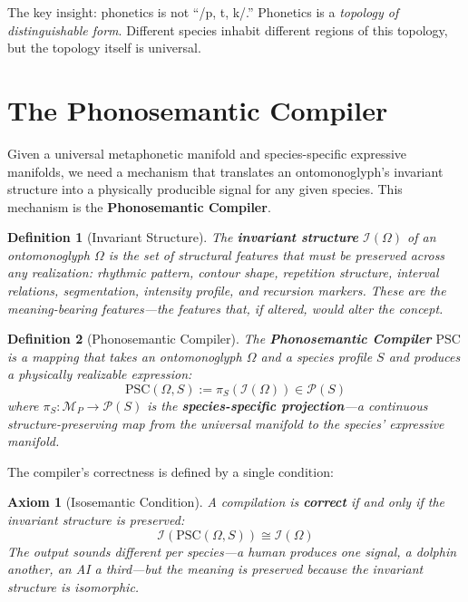 \documentclass[12pt, letterpaper]{book}
\newtheorem{axiom}{Axiom}[chapter]
\newtheorem{definition}{Definition}[chapter]
\begin{document}
The key insight: phonetics is not ``/p, t, k/.'' Phonetics is a \textit{topology of distinguishable form}. Different species inhabit different regions of this topology, but the topology itself is universal.


\section{The Phonosemantic Compiler}

Given a universal metaphonetic manifold and species-specific expressive manifolds, we need a mechanism that translates an ontomonoglyph's invariant structure into a physically producible signal for any given species. This mechanism is the \textbf{Phonosemantic Compiler}.

\begin{definition}[Invariant Structure]\label{def:invariants}
The \textbf{invariant structure} $\mathcal{I}(\Omega)$ of an ontomonoglyph $\Omega$ is the set of structural features that must be preserved across any realization: rhythmic pattern, contour shape, repetition structure, interval relations, segmentation, intensity profile, and recursion markers. These are the meaning-bearing features---the features that, if altered, would alter the concept.
\end{definition}

\begin{definition}[Phonosemantic Compiler]\label{def:psc}
The \textbf{Phonosemantic Compiler} $\mathrm{PSC}$ is a mapping that takes an ontomonoglyph $\Omega$ and a species profile $S$ and produces a physically realizable expression:
\[
\mathrm{PSC}(\Omega, S) := \pi_S(\mathcal{I}(\Omega)) \in \mathcal{P}(S)
\]
where $\pi_S: \mathcal{M}_P \to \mathcal{P}(S)$ is the \textbf{species-specific projection}---a continuous structure-preserving map from the universal manifold to the species' expressive manifold.
\end{definition}

The compiler's correctness is defined by a single condition:

\begin{axiom}[Isosemantic Condition]\label{ax:isosemantic}
A compilation is \textbf{correct} if and only if the invariant structure is preserved:
\[
\mathcal{I}(\mathrm{PSC}(\Omega, S)) \cong \mathcal{I}(\Omega)
\]
The output sounds different per species---a human produces one signal, a dolphin another, an AI a third---but the meaning is preserved because the invariant structure is isomorphic.
\end{axiom}
\end{document}
